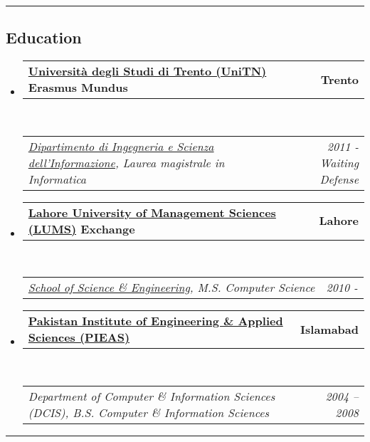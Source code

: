\documentclass[10pt,letterpaper]{article}
\makeatletter
\newcommand{\headerrow}[2]
{\begin{tabular*}{\linewidth}{l@{\extracolsep{\fill}}r}
	#1 &
	#2 \\
\end{tabular*}}
\makeatother
\begin{document}
\hrule
\vspace{-0.4em}
\subsection*{Education}

\begin{itemize}
	\parskip=0.1em

	\item
	\headerrow
		{\textbf{\href{http://www.unitn.it}{Università degli Studi di Trento (UniTN)} Erasmus Mundus}}
		{\textbf{Trento}}
	\\
	\headerrow
        {\emph{\href{http://disi.unitn.it/}{Dipartimento di Ingegneria e Scienza dell'Informazione}, Laurea magistrale in Informatica}}
        {\emph{2011 - Waiting Defense}}

	\item
	\headerrow
		{\textbf{\href{http://www.lums.edu.pk}{Lahore University of Management Sciences (LUMS)} Exchange}}
		{\textbf{Lahore}}
	\\
	\headerrow
        {\emph{\href{http://sse.lums.edu.pk}{School of Science \& Engineering}, M.S. Computer Science}}
        {\emph{2010 - }}

	\item
	\headerrow
		{\textbf{\href{http://www.pieas.edu.pk}{Pakistan Institute of Engineering \& Applied Sciences (PIEAS)}}}
		{\textbf{Islamabad}}
	\\
	\headerrow
		{\emph{Department of Computer \& Information Sciences (DCIS), B.S. Computer \& Information Sciences}}
		{\emph{2004 -- 2008}}

\end{itemize}

\hrule
\vspace{-0.4em}
\end{document}
